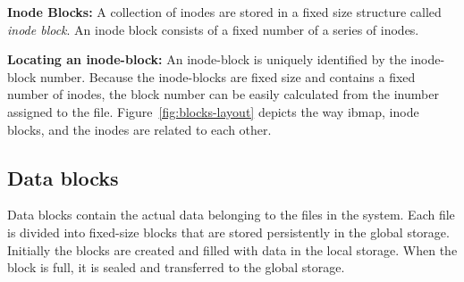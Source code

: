 \documentclass[]{article}
\newcommand{\subtopic}[1]{\vspace{1.5pt} \noindent \textbf{#1}}
\begin{document}
\subtopic{Inode Blocks:} A collection of inodes are stored in a fixed size
structure called \textit{inode block}. An inode block consists of a fixed
number of a series of inodes. 


\subtopic{Locating an inode-block:} An inode-block is uniquely identified by
the inode-block number.  Because the inode-blocks are fixed size and contains a
fixed number of inodes, the block number can be easily calculated from the
inumber assigned to the file.
Figure~\ref{fig:blocks-layout} depicts the way ibmap, inode blocks, and the
inodes are related to each other.




\subsection{Data blocks}

Data blocks contain the actual data belonging to the files in the system.
Each file is divided into fixed-size blocks that are stored persistently in
the global storage. Initially the blocks are created and filled with data
in the local storage. When the block is full, it is sealed and transferred 
to the global storage. 
\end{document}
